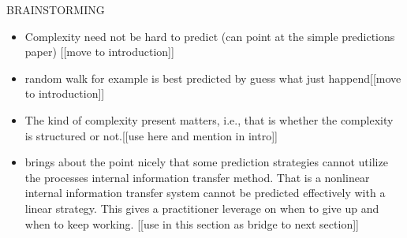 BRAINSTORMING 
\begin{itemize}
\item Complexity need not be hard to predict (can point at the simple predictions paper) [[move to introduction]]
\item random walk for example is best predicted by guess what just happend[[move to introduction]]
\item The kind of complexity present matters, i.e., that is whether the complexity is structured or not.[[use here and mention in intro]] 






\item \col brings about the point nicely that some prediction strategies cannot utilize the processes internal information transfer method. That is a nonlinear internal information transfer system cannot be predicted effectively with a linear strategy. This gives a practitioner leverage on when to give up and when to keep working. [[use in this section as bridge to next section]]

\end{itemize}



